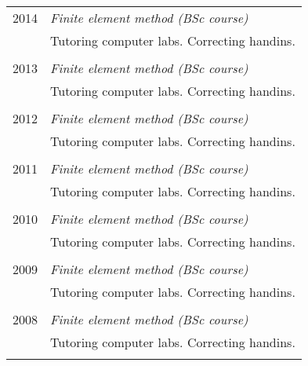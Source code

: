 \documentclass[a4paper,10pt]{article} %
\begin{document}
\begin{tabular}{r|p{11cm}}
\textsc{2014} & \emph{Finite element method (BSc course)}\\ 
& \footnotesize{Tutoring computer labs. Correcting handins.}\\
\multicolumn{2}{c}{} \\


\textsc{2013} & \emph{Finite element method (BSc course)}\\ 
& \footnotesize{Tutoring computer labs. Correcting handins.}\\
\multicolumn{2}{c}{} \\


\textsc{2012} & \emph{Finite element method (BSc course)}\\ 
& \footnotesize{Tutoring computer labs. Correcting handins.}\\
\multicolumn{2}{c}{} \\


\textsc{2011} & \emph{Finite element method (BSc course)}\\ 
& \footnotesize{Tutoring computer labs. Correcting handins.}\\
\multicolumn{2}{c}{} \\


\textsc{2010} & \emph{Finite element method (BSc course)}\\ 
& \footnotesize{Tutoring computer labs. Correcting handins.}\\
\multicolumn{2}{c}{} \\


\textsc{2009} & \emph{Finite element method (BSc course)}\\ 
& \footnotesize{Tutoring computer labs. Correcting handins.}\\
\multicolumn{2}{c}{} \\


\textsc{2008} & \emph{Finite element method (BSc course)}\\ 
& \footnotesize{Tutoring computer labs. Correcting handins.}\\
\multicolumn{2}{c}{} \\


\end{tabular}
\end{document}
